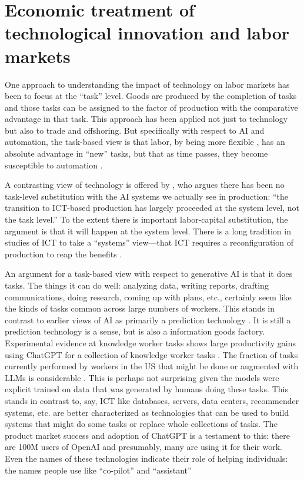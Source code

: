 \documentclass{article}
\begin{document}
\section{Economic treatment of technological innovation and labor markets}
One approach to understanding the impact of technology on labor markets has been to focus at the ``task'' level.
Goods are produced by the completion of tasks and those tasks can be assigned to the factor of production with the comparative advantage in that task.
This approach has been applied not just to technology but also to trade and offshoring.
But specifically with respect to AI and automation, the task-based view is that labor, by being more flexible \citep{acemoglu2011skills}, has an absolute advantage in ``new'' tasks, but that as time passes, they become susceptible to automation \citep{acemoglu2018}.

A contrasting view of technology is offered by \cite{bresnahan2020artificial}, who argues there has been no task-level substitution with the AI systems we actually see in production: ``the transition to ICT-based production has largely proceeded at the system level, not the task level.''
To the extent there is important labor-capital substitution, the argument is that it will happen at the system level.
There is a long tradition in studies of ICT to take a ``systems'' view---that ICT requires a reconfiguration of production to reap the benefits \citep{bresnahan2002information}. %

An argument for a task-based view with respect to generative AI is that it does tasks.
The things it can do well: analyzing data, writing reports, drafting communications, doing research, coming up with plans, etc., certainly seem like the kinds of tasks common across large numbers of workers.
This stands in contrast to earlier views of AI as primarily a prediction technology \citep{agrawal2019}.
It is still a prediction technology is a sense, but is also a information goods factory. 
Experimental evidence at knowledge worker tasks shows large productivity gains using ChatGPT for a collection of knowledge worker tasks \citep{noy2023experimental}.
The fraction of tasks currently performed by workers in the US that might be done or augmented with LLMs is considerable \citep{eloundou2023gpts}.
This is perhaps not surprising given the models were explicit trained on data that was generated by humans doing these tasks.
This stands in contrast to, say, ICT like databases, servers, data centers, recommender systems, etc. are better characterized as technologies that can be used to build systems that might do some tasks or replace whole collections of tasks.  
The product market success and adoption of ChatGPT is a testament to this: there are 100M users of OpenAI and presumably, many are using it for their work.
Even the names of these technologies indicate their role of helping individuals: the names people use like ``co-pilot'' and ``assistant'' 
\end{document}
